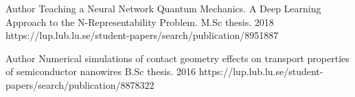 


\begin{cventries}

\cventry
{Author} %
{Teaching a Neural Network Quantum Mechanics. A Deep Learning Approach to the
N-Representability Problem.} %
{ %
M.Sc thesis.
}
{2018} %
{https://lup.lub.lu.se/student-papers/search/publication/8951887} %


\cventry
{Author} %
{Numerical simulations of contact geometry effects on transport properties of semiconductor nanowires} %
{ %
B.Sc thesis.
}
{2016} %
{https://lup.lub.lu.se/student-papers/search/publication/8878322} %

\end{cventries}
